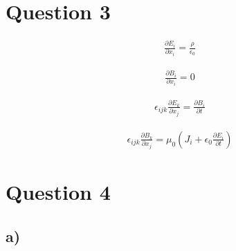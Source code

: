 \documentclass[paper=a4, fontsize=12pt]{scrartcl}
\begin{document}
\section*{Question 3}
\begin{align*}
\frac{\partial E_i}{\partial x_i} = \frac{\rho}{\epsilon_0}
\end{align*}

\begin{align*}
\frac{\partial B_i}{\partial x_i} = 0
\end{align*}

\begin{align*}
\epsilon_{ijk}\frac{\partial E_k}{\partial x_j} = \frac{\partial B_i}{\partial t}
\end{align*}

\begin{align*}
\epsilon_{ijk}\frac{\partial B_k}{\partial x_j} = \mu_0(J_i + \epsilon_0 \frac{\partial E_i}{\partial t})
\end{align*}
	
\section*{Question 4}
\subsection*{a)}
	
\end{document}
